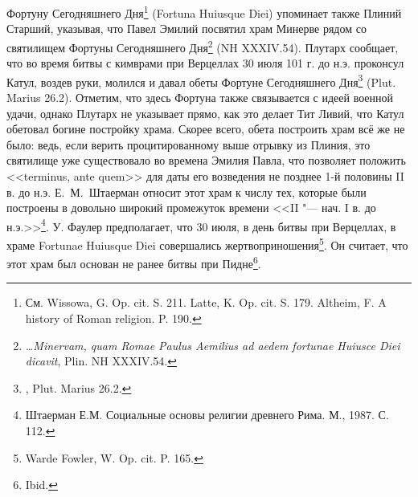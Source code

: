 Фортуну Сегодняшнего Дня\footnote{См. Wissowa, G. Op. cit. S. 211. Latte, K. Op. cit. S. 179. Altheim, F. A history of Roman religion. P. 190.} (Fortuna Huiusque Diei) упоминает также Плиний Старший, указывая, что Павел Эмилий посвятил храм Минерве рядом со святилищем Фортуны Сегодняшнего Дня\footnote{\textit{\ldots{}Minervam, quam Romae Paulus Aemilius ad aedem fortunae Huiusce Diei dicavit}, Plin. NH XXXIV.54.} (NH XXXIV.54). Плутарх сообщает, что во время битвы с кимврами при Верцеллах 30 июля 101 г. до н.э. проконсул Катул, воздев руки, молился и давал обеты Фортуне Сегодняшнего Дня\footnote{, Plut. Marius 26.2.} (Plut. Marius 26.2). Отметим, что здесь Фортуна также связывается с идеей военной удачи, однако Плутарх не указывает прямо, как это делает Тит Ливий, что Катул обетовал богине постройку храма. Скорее всего, обета построить храм всё же не было: ведь, если верить процитированному выше отрывку из Плиния, это святилище уже существовало во времена Эмилия Павла, что позволяет положить <<terminus, ante quem>> для даты его возведения не позднее 1-й половины II в. до н.э. Е.~М.~Штаерман относит этот храм к числу тех, которые были построены в довольно широкий промежуток времени <<II "--- нач. I в. до н.э.>>\footnote{Штаерман Е.М. Социальные основы религии древнего Рима. М., 1987. С. 112.}. У. Фаулер предполагает, что 30 июля, в день битвы при Верцеллах, в храме Fortunae Huiusque Diei совершались жертвоприношения\footnote{Warde Fowler, W. Op. cit. P. 165.}. Он считает, что этот храм был основан не ранее битвы при Пидне\footnote{Ibid.}.






